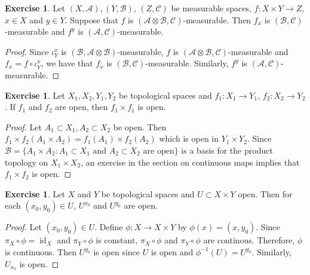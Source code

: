 \documentclass{book}
\theoremstyle{definition}
\newtheorem{ex}[definition]{Exercise}
\newcommand{\MA}{\mathcal{A}}
\newcommand{\MB}{\mathcal{B}}
\newcommand{\MC}{\mathcal{C}}
\newcommand{\lex}[1]{\label{ex:#1}}
\DeclareMathOperator{\id}{id}
\DeclareMathOperator*{\0}{\mbf{0}}
\DeclareMathOperator*{\1}{\mbf{1}}
\begin{document}
	\begin{ex}  \lex{25014}
		Let $(X,\MA), (Y, \MB)$, $(Z, \MC)$ be measurable spaces, $f: X \times Y \rightarrow Z$, $x \in X$ and $y \in Y$. Suppose that $f$ is $(\MA \otimes \MB, \MC)$-measurable. Then $f_x$ is $(\MB, \MC)$-measurable and $f^y$ is $(\MA, \MC)$-measurable. 
	\end{ex}
	
	\begin{proof}
		Since $\iota^x_Y$ is $(\MB, \MA \otimes \MB)$-measurable, $f$ is $(\MA \otimes \MB, \MC)$-measurable and $f_x = f \circ \iota^x_Y$, we have that $f_x$ is $(\MB, \MC)$-measurable. Similarly, $f^y$ is $(\MA, \MC)$-measurable.
	\end{proof}













	
	\begin{ex}
		Let $X_1, X_2,Y_1,Y_2$ be topological spaces and $f_1:X_1 \rightarrow Y_1$, $f_2:X_2 \rightarrow Y_2$. If $f_1$ and $f_2$ are open, then $f_1 \times f_1$ is open.
	\end{ex}
	
	\begin{proof}
		Let $A_1 \subset X_1, A_2 \subset X_2$ be open. Then $f_1 \times f_2(A_1 \times A_2) = f_1(A_1) \times f_2(A_2)$ which is open in $Y_1 \times Y_2$. Since $\MB = \{A_1 \times A_2:  \text{$A_1 \subset X_1$ and $A_2 \subset X_2$ are open} \}$ is a basis for the product topology on $X_1 \times X_2$, an exercise in the section on continuous maps implies that $f_1 \times f_2$ is open.
	\end{proof}
	
	\begin{ex}
		Let $X$ and $Y$ be topological spaces and $U \subset X \times Y$ open. Then for each $(x_0,  y_0) \in U$, $U^{x_0}$ and $U^{y_0}$ are open.
	\end{ex}
	
	\begin{proof}
		Let $(x_0, y_0) \in U$. Define $\phi: X \rightarrow X \times Y$ by $\phi(x) = (x, y_0)$. Since $\pi_X \circ \phi = \id_X$ and $\pi_Y \circ \phi$ is constant, $\pi_X \circ \phi$ and $\pi_Y \circ \phi$ are continous. Therefore, $\phi$ is continuous. Then $U^{y_0}$ is open since $U$ is open and $\phi^{-1}(U) = U^{y_0}$. Similarly, $U_{x_0}$ is open.
	\end{proof}
	
\end{document}
